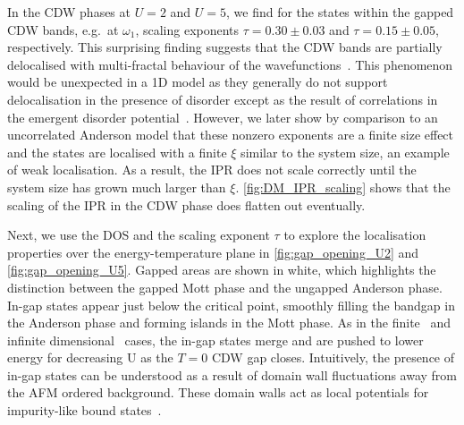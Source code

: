 In the CDW phases at \(U=2\) and \(U=5\), we find for the states within the gapped CDW bands, e.g.~at \(\omega_1\), scaling exponents \(\tau = 0.30\pm0.03\) and \(\tau = 0.15\pm0.05\), respectively. This surprising finding suggests that the CDW bands are partially delocalised with multi-fractal behaviour of the wavefunctions~\autocite{eversAndersonTransitions2008}. This phenomenon would be unexpected in a 1D model as they generally do not support delocalisation in the presence of disorder except as the result of correlations in the emergent disorder potential~\autocite{croyAndersonLocalization1D2011,goldshteinPurePointSpectrum1977}. However, we later show by comparison to an uncorrelated Anderson model that these nonzero exponents are a finite size effect and the states are localised with a finite \(\xi\) similar to the system size, an example of weak localisation. As a result, the IPR does not scale correctly until the system size has grown much larger than \(\xi\). \cref{fig:DM_IPR_scaling} shows that the scaling of the IPR in the CDW phase does flatten out eventually.

Next, we use the DOS and the scaling exponent \(\tau\) to explore the localisation properties over the energy-temperature plane in \cref{fig:gap_opening_U2} and \cref{fig:gap_opening_U5}. Gapped areas are shown in white, which highlights the distinction between the gapped Mott phase and the ungapped Anderson phase. In-gap states appear just below the critical point, smoothly filling the bandgap in the Anderson phase and forming islands in the Mott phase. As in the finite~\autocite{zondaGaplessRegimeCharge2019} and infinite dimensional~\autocite{hassanSpectralPropertiesChargedensitywave2007} cases, the in-gap states merge and are pushed to lower energy for decreasing U as the \(T=0\) CDW gap closes. Intuitively, the presence of in-gap states can be understood as a result of domain wall fluctuations away from the AFM ordered background. These domain walls act as local potentials for impurity-like bound states~\autocite{zondaGaplessRegimeCharge2019}.

